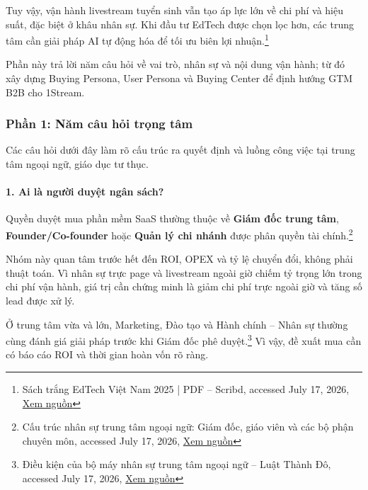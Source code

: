 Tuy vậy, vận hành livestream tuyển sinh vẫn tạo áp lực lớn về chi phí và hiệu suất, đặc biệt ở khâu nhân sự. Khi đầu tư EdTech được chọn lọc hơn, các trung tâm cần giải pháp AI tự động hóa để tối ưu biên lợi nhuận.\footnote{Sách trắng EdTech Việt Nam 2025 | PDF -- Scribd, accessed July 17, 2026, \href{https://www.scribd.com/document/996258987/Sa-ch-tra-ng-EdTech-Vi\%E1\%BB\%87t-Nam-2025}{Xem nguồn}}

Phần này trả lời năm câu hỏi về vai trò, nhân sự và nội dung vận hành; từ đó xây dựng Buying Persona, User Persona và Buying Center để định hướng GTM B2B cho 1Stream.

\subsubsection{Phần 1: Năm câu hỏi trọng tâm}

Các câu hỏi dưới đây làm rõ cấu trúc ra quyết định và luồng công việc tại trung tâm ngoại ngữ, giáo dục tư thục.

\paragraph{1. Ai là người duyệt ngân sách?}

Quyền duyệt mua phần mềm SaaS thường thuộc về \textbf{Giám đốc trung tâm}, \textbf{Founder/Co-founder} hoặc \textbf{Quản lý chi nhánh} được phân quyền tài chính.\footnote{Cấu trúc nhân sự trung tâm ngoại ngữ: Giám đốc, giáo viên và các bộ phận chuyên môn, accessed July 17, 2026, \href{https://luatminhthinh.vn/cau-truc-nhan-su-trung-tam-ngoai-ngu-giam-doc-giao-vien-va-cac-bo-phan-chuyen-mon/}{Xem nguồn}}

Nhóm này quan tâm trước hết đến ROI, OPEX và tỷ lệ chuyển đổi, không phải thuật toán. Vì nhân sự trực page và livestream ngoài giờ chiếm tỷ trọng lớn trong chi phí vận hành, giá trị cần chứng minh là giảm chi phí trực ngoài giờ và tăng số lead được xử lý.

Ở trung tâm vừa và lớn, Marketing, Đào tạo và Hành chính -- Nhân sự thường cùng đánh giá giải pháp trước khi Giám đốc phê duyệt.\footnote{Điều kiện của bộ máy nhân sự trung tâm ngoại ngữ -- Luật Thành Đô, accessed July 17, 2026, \href{https://luatthanhdo.com.vn/dieu-kien-cua-bo-may-nhan-su-trung-tam-ngoai-ngu}{Xem nguồn}} Vì vậy, đề xuất mua cần có báo cáo ROI và thời gian hoàn vốn rõ ràng.

